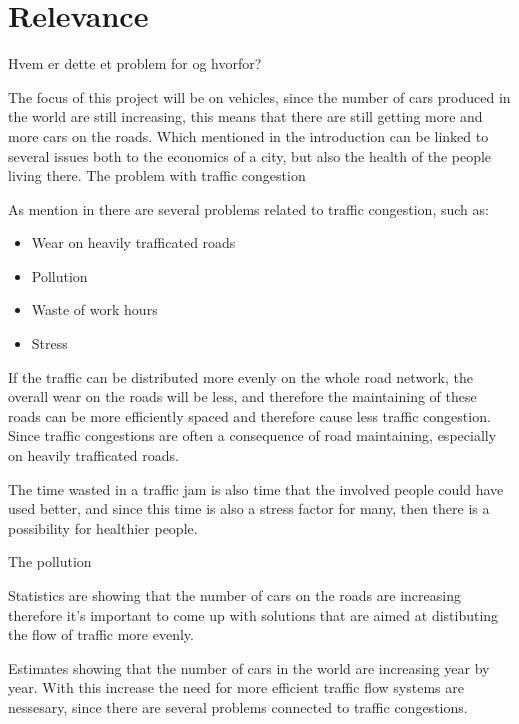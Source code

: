 \section{Relevance}
Hvem er dette et problem for og hvorfor?

The focus of this project will be on vehicles, since the number of cars produced in the world are still increasing, this means that there are still getting more and more cars on the roads. Which mentioned in the introduction can be linked to several issues both to the economics of a city, but also the health of the people living there.
The problem with traffic congestion 

As mention in  there are several problems related to traffic congestion, such as:
\begin{itemize}
	\item Wear on heavily trafficated roads
	\item Pollution
	\item Waste of work hours
	\item Stress
\end{itemize}

If the traffic can be distributed more evenly on the whole road network, the overall wear on the roads will be less, and therefore the maintaining of these roads can be more efficiently spaced and therefore cause less traffic congestion.
Since traffic congestions are often a consequence of road maintaining, especially on heavily trafficated roads.

The time wasted in a traffic jam is also time that the involved people could have used better, and since this time is also a stress factor for many, then there is a possibility for healthier people. 

The pollution 




Statistics are showing that the number of cars on the roads are increasing therefore it's important to come up with solutions that are aimed at distibuting the flow of traffic more evenly.

Estimates showing that the number of cars in the world are increasing year by year.\cite{http://wardsauto.com/ar/world_vehicle_population_110815} With this increase the need for more efficient traffic flow systems are nessesary, since there are several problems connected to traffic congestions.